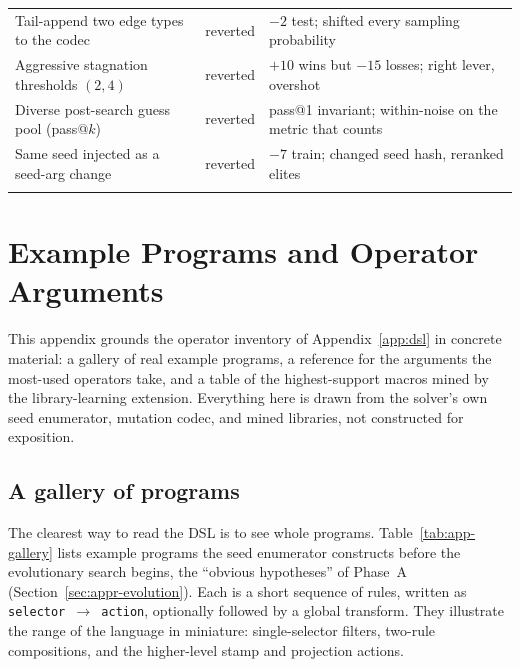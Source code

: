 \begin{table}[htbp]
\begin{tabular}{p{5.9cm}p{1.5cm}p{4.8cm}}
Tail-append two edge types to the codec & reverted & $-2$ test; shifted every sampling probability \\
Aggressive stagnation thresholds $(2,4)$ & reverted & $+10$ wins but $-15$ losses; right lever, overshot \\
Diverse post-search guess pool (pass@$k$) & reverted & pass@1 invariant; within-noise on the metric that counts \\
Same seed injected as a seed-arg change & reverted & $-7$ train; changed seed hash, reranked elites \\
\noalign{\smallskip}\hline
\end{tabular}
\end{table}

\chapter{Example Programs and Operator Arguments}
\label{app:examples}

This appendix grounds the operator inventory of Appendix~\ref{app:dsl} in concrete
material: a gallery of real example programs, a reference for the arguments the most-used
operators take, and a table of the highest-support macros mined by the library-learning
extension. Everything here is drawn from the solver's own seed enumerator, mutation codec,
and mined libraries, not constructed for exposition.

\section{A gallery of programs}
\label{app:gallery}

The clearest way to read the DSL is to see whole programs. Table~\ref{tab:app-gallery}
lists example programs the seed enumerator constructs before the evolutionary search
begins, the ``obvious hypotheses'' of Phase~A (Section~\ref{sec:appr-evolution}). Each
is a short sequence of rules, written as \texttt{selector $\to$ action}, optionally
followed by a global transform. They illustrate the range of the language in miniature:
single-selector filters, two-rule compositions, and the higher-level stamp and projection
actions.

